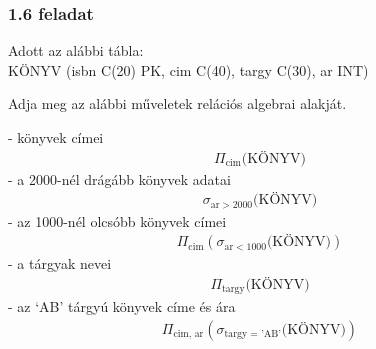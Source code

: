 \documentclass{beamer}
\title[Adatbázis rendszerek MSc gyakorlat]{}
\author[Nagy Dániel Zoltán JJ181J]{}
\begin{document}

\begin{frame}[fragile]
\frametitle{1.6 feladat}
Adott az alábbi tábla:\\
KÖNYV (isbn C(20) PK, cim C(40), targy C(30), ar INT)


Adja meg az alábbi műveletek relációs algebrai alakját.


- könyvek címei
\begin{align*}
\Pi_{\text{cim}}{\text{(KÖNYV)}}
\end{align*}
- a 2000-nél drágább könyvek adatai
\begin{align*}
\sigma_{\text{ar}>2000}{\text{(KÖNYV)}}
\end{align*}
- az 1000-nél olcsóbb könyvek címei
\begin{align*}
\Pi_{\text{cim}}(\sigma_{\text{ar}<1000}{\text{(KÖNYV)}})
\end{align*}
- a tárgyak nevei
\begin{align*}
\Pi_{\text{targy}}{\text{(KÖNYV)}}
\end{align*}
- az ‘AB’ tárgyú könyvek címe és ára
\begin{align*}
\Pi_{\text{cim, ar}}(\sigma_{\text{targy = 'AB'}}{\text{(KÖNYV)}})
\end{align*}

\end{frame}
\end{document}
